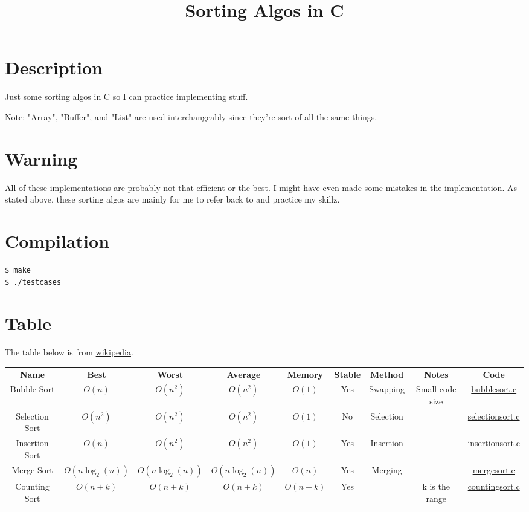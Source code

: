 \documentclass{article}
\title{Sorting Algos in C}
\date{}
\begin{document}
\maketitle
\section{Description}
Just some sorting algos in C so I can practice implementing stuff. \newline

Note: "Array", "Buffer", and "List" are used interchangeably since they're sort of all the same things.

\section{Warning}
All of these implementations are probably not that efficient or the best. I might have even made some mistakes in the implementation.  
As stated above, these sorting algos are mainly for me to refer back to and practice my skillz.

\section{Compilation}

\begin{verbatim} 
$ make
$ ./testcases
\end{verbatim}

\section{Table}
The table below is from \href{https://en.wikipedia.org/wiki/Sorting_algorithm}{wikipedia}.
\begin{center}
    \begin{tabular}{ |c|c|c|c|c|c|c|c|c| }
    \hline
    \textbf{Name} & \textbf{Best} & \textbf{Worst} & \textbf{Average} & \textbf{Memory} & \textbf{Stable} & \textbf{Method} & \textbf{Notes} & \textbf{Code}\\
        Bubble Sort & $O(n)$ & $O(n^2)$ & $O(n^2)$ & $O(1)$ & Yes & Swapping & Small code size & \href{algos/bubblesort.c}{bubblesort.c} \\
        Selection Sort & $O(n^2)$ & $O(n^2)$ & $O(n^2)$ & $O(1)$ & No & Selection & & \href{algos/selectionsort.c}{selectionsort.c} \\
        Insertion Sort & $O(n)$ & $O(n^2)$ & $O(n^2)$ & $O(1)$ & Yes & Insertion & & \href{algos/insertionsort.c}{insertionsort.c} \\
        Merge Sort & $O(n \log_2(n))$ & $O(n \log_2(n))$ & $O(n \log_2(n)) $ & $O(n)$ & Yes & Merging & & \href{algos/mergesort.c}{mergesort.c} \\
        Counting Sort & $O(n + k)$ & $O(n + k)$ & $O(n + k) $ & $O(n + k)$ & Yes &  & k is the range & \href{algos/countingsort.c}{countingsort.c} \\
    \hline
\end{tabular}
\end{center}
\end{document}
